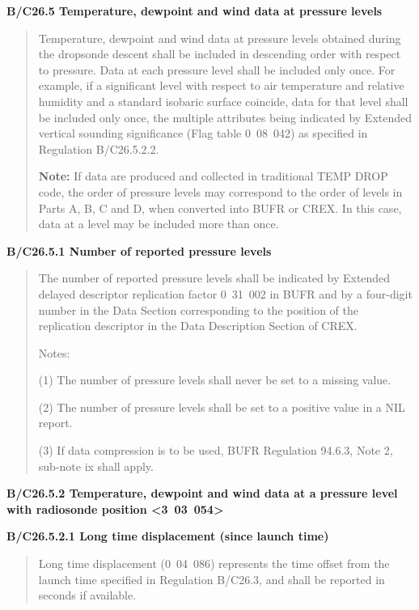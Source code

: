\textbf{B/C26.5 Temperature, dewpoint and wind data at pressure levels}

\begin{quote}
Temperature, dewpoint and wind data at pressure levels obtained during the dropsonde descent shall be included in descending order with respect to pressure. Data at each pressure level shall be included only once. For example, if a significant level with respect to air temperature and relative humidity and a standard isobaric surface coincide, data for that level shall be included only once, the multiple attributes being indicated by Extended vertical sounding significance (Flag table 0~08~042) as specified in Regulation B/C26.5.2.2.

\textbf{Note:} If data are produced and collected in traditional TEMP DROP code, the order of pressure levels may correspond to the order of levels in Parts A, B, C and D, when converted into BUFR or CREX. In this case, data at a level may be included more than once.
\end{quote}

\textbf{B/C26.5.1 Number of reported pressure levels}

\begin{quote}
The number of reported pressure levels shall be indicated by Extended delayed descriptor replication factor 0~31~002 in BUFR and by a four-digit number in the Data Section corresponding to the position of the replication descriptor in the Data Description Section of CREX.

Notes:

(1) The number of pressure levels shall never be set to a missing value.

(2) The number of pressure levels shall be set to a positive value in a NIL report.

(3) If data compression is to be used, BUFR Regulation 94.6.3, Note 2, sub-note ix shall apply.
\end{quote}

\textbf{B/C26.5.2 Temperature, dewpoint and wind data at a pressure level} \textbf{with radiosonde position \textless3~03~054\textgreater{}}

\textbf{B/C26.5.2.1 Long time displacement (since launch time)}

\begin{quote}
Long time displacement (0~04~086) represents the time offset from the launch time specified in Regulation B/C26.3, and shall be reported in seconds if available.
\end{quote}

